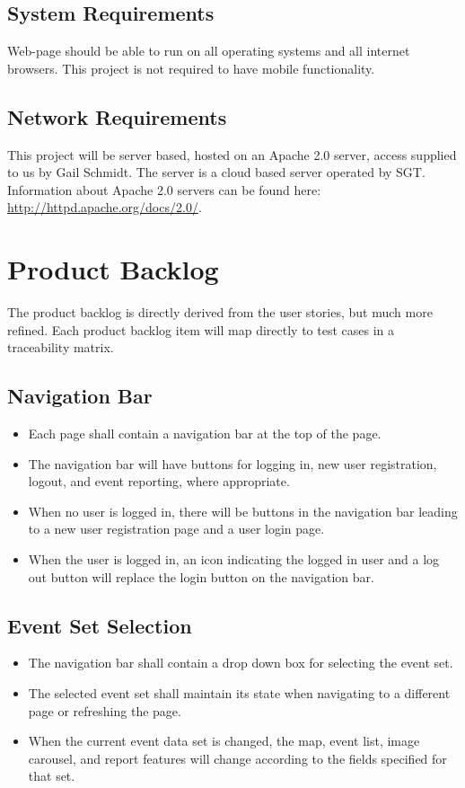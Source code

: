 \subsection{System  Requirements}
Web-page should be able to run on all operating systems and all internet browsers. This project is not required to have mobile functionality. 

\subsection{Network Requirements}
This project will be server based, hosted on an Apache 2.0 server, access supplied to us by Gail Schmidt. The server is a cloud based server operated by SGT. Information about Apache 2.0 servers can be found here: \url{http://httpd.apache.org/docs/2.0/}. 

\section{Product Backlog}
The product backlog is directly derived from the user stories, but much more refined. Each product backlog item will map directly to test cases in a traceability matrix.

\subsection{Navigation Bar}
\begin{itemize}
\item Each page shall contain a navigation bar at the top of the page.
\item The navigation bar will have buttons for logging in, new user registration, logout, and event reporting, where appropriate.
\item When no user is logged in, there will be buttons in the navigation bar leading to a new user registration page and a user login page.
\item When the user is logged in, an icon indicating the logged in user and a log out button will replace the login button on the navigation bar.
\end{itemize}

\subsection{Event Set Selection}
\begin{itemize}
\item The navigation bar shall contain a drop down box for selecting the event set.
\item The selected event set shall maintain its state when navigating to a different page or refreshing the page.
\item When the current event data set is changed, the map, event list, image carousel, and report features will change according to the fields specified for that set.
\end{itemize}

